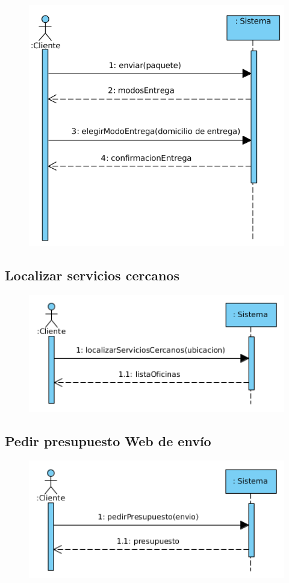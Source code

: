 \begin{figure}[H]
	\centering
	\includegraphics[width=16cm]{49}
\end{figure}
\subsection{Localizar servicios cercanos}
\begin{figure}[H]
	\centering
	\includegraphics[width=16cm]{50}
\end{figure}
\subsection{Pedir presupuesto Web de envío}
\begin{figure}[H]
	\centering
	\includegraphics[width=16cm]{51}
\end{figure}
